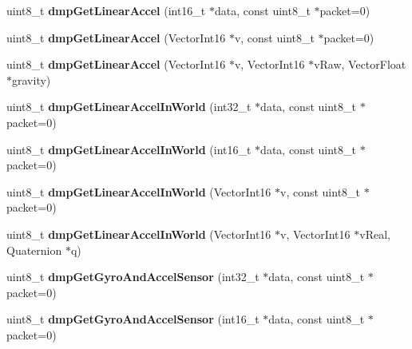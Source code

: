 \begin{DoxyCompactItemize}
\mbox{\label{classMPU6050_ac3a746d1a5c2d9973f2315bd998fb102}} 
uint8\+\_\+t {\bfseries dmp\+Get\+Linear\+Accel} (int16\+\_\+t $\ast$data, const uint8\+\_\+t $\ast$packet=0)
\item 
\mbox{\label{classMPU6050_a72cfa08b409ce18689f19b81bd285780}} 
uint8\+\_\+t {\bfseries dmp\+Get\+Linear\+Accel} (Vector\+Int16 $\ast$v, const uint8\+\_\+t $\ast$packet=0)
\item 
\mbox{\label{classMPU6050_aa58cddb02075ed4e7ae0afa51cfdce7d}} 
uint8\+\_\+t {\bfseries dmp\+Get\+Linear\+Accel} (Vector\+Int16 $\ast$v, Vector\+Int16 $\ast$v\+Raw, Vector\+Float $\ast$gravity)
\item 
\mbox{\label{classMPU6050_a1c63096808722eafb96e88e41a4af115}} 
uint8\+\_\+t {\bfseries dmp\+Get\+Linear\+Accel\+In\+World} (int32\+\_\+t $\ast$data, const uint8\+\_\+t $\ast$packet=0)
\item 
\mbox{\label{classMPU6050_a097673d9ae96274ab711aaef7827411d}} 
uint8\+\_\+t {\bfseries dmp\+Get\+Linear\+Accel\+In\+World} (int16\+\_\+t $\ast$data, const uint8\+\_\+t $\ast$packet=0)
\item 
\mbox{\label{classMPU6050_a848b210e89382c1f7c7fb3ee679b3852}} 
uint8\+\_\+t {\bfseries dmp\+Get\+Linear\+Accel\+In\+World} (Vector\+Int16 $\ast$v, const uint8\+\_\+t $\ast$packet=0)
\item 
\mbox{\label{classMPU6050_a6c09e9168261daff945d1e0757598b61}} 
uint8\+\_\+t {\bfseries dmp\+Get\+Linear\+Accel\+In\+World} (Vector\+Int16 $\ast$v, Vector\+Int16 $\ast$v\+Real, Quaternion $\ast$q)
\item 
\mbox{\label{classMPU6050_acf5f700d018798475b93d56652e39788}} 
uint8\+\_\+t {\bfseries dmp\+Get\+Gyro\+And\+Accel\+Sensor} (int32\+\_\+t $\ast$data, const uint8\+\_\+t $\ast$packet=0)
\item 
\mbox{\label{classMPU6050_ad8caffca939574f73c7c300baee339b7}} 
uint8\+\_\+t {\bfseries dmp\+Get\+Gyro\+And\+Accel\+Sensor} (int16\+\_\+t $\ast$data, const uint8\+\_\+t $\ast$packet=0)
\item 

\end{DoxyCompactItemize}
